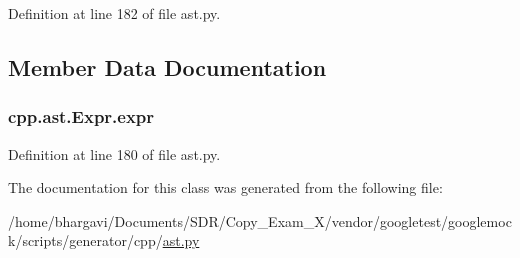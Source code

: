 Definition at line 182 of file ast.\+py.



\subsection{Member Data Documentation}
\subsubsection[{\texorpdfstring{expr}{expr}}]{\setlength{\rightskip}{0pt plus 5cm}cpp.\+ast.\+Expr.\+expr}\hypertarget{classcpp_1_1ast_1_1_expr_a2f4e13fb0176f2616f8703103c806462}{}\label{classcpp_1_1ast_1_1_expr_a2f4e13fb0176f2616f8703103c806462}


Definition at line 180 of file ast.\+py.



The documentation for this class was generated from the following file\+:\begin{DoxyCompactItemize}
\item 
/home/bhargavi/\+Documents/\+S\+D\+R/\+Copy\+\_\+\+Exam\+\_\+X/vendor/googletest/googlemock/scripts/generator/cpp/\hyperlink{ast_8py}{ast.\+py}\end{DoxyCompactItemize}
